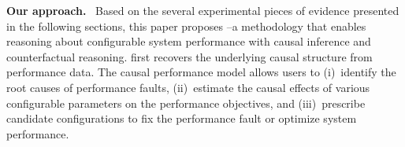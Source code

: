
\noindent\textbf{Our approach.}~
Based on the several experimental pieces of evidence presented in the following sections, this paper proposes \ourapproach--a methodology that enables reasoning about configurable system performance with causal inference and counterfactual reasoning. \ourapproach first recovers the underlying causal structure from performance data. The causal performance model %
allows users to (i)~identify the root causes of performance faults, (ii)~estimate the causal effects of various configurable parameters on the performance objectives, and (iii)~prescribe candidate configurations to fix the performance fault or optimize system performance. 
% 
% 
% 
% 



